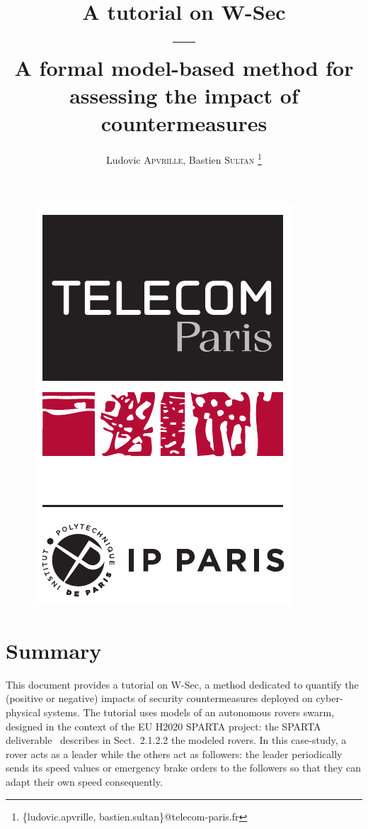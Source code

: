 \documentclass{article}
\author{Ludovic \textsc{Apvrille}, Bastien \textsc{Sultan}
	\thanks{\{ludovic.apvrille, bastien.sultan\}@telecom-paris.fr}}
\affil{\emph{Télécom Paris}\\\emph{LabSoC Research Group}\\\emph{450, route des Chappes, F-06410 Biot}}
\title{\textbf{A tutorial on W-Sec}\\---\\A formal model-based method for assessing the impact of countermeasures}
\date{}
\begin{document}
\begin{figure}[t]
	\centering
	\includegraphics[scale=.4]{figures/logo.pdf}
\end{figure}
\maketitle


\section{Summary}

This document provides a tutorial on W-Sec, a method dedicated to quantify the (positive or negative) impacts of security countermeasures deployed on cyber-physical systems. The tutorial uses models of an autonomous rovers swarm, designed in the context of the EU H2020 SPARTA project: the SPARTA deliverable~\cite{d51} describes in Sect.~2.1.2.2 the modeled rovers. In this case-study, a rover acts as a leader while the others act as followers: the leader periodically sends its speed values or emergency brake orders to the followers so that they can adapt their own speed consequently.
\end{document}
